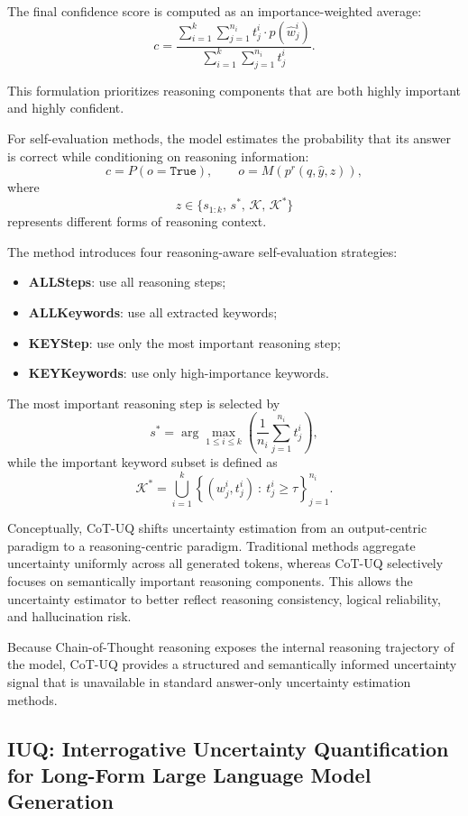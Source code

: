 The final confidence score is computed as an importance-weighted average:
\[
c
=
\frac{
\sum_{i=1}^k \sum_{j=1}^{n_i}
t_j^i \cdot p(\hat w_j^i)
}{
\sum_{i=1}^k \sum_{j=1}^{n_i}
t_j^i
}.
\]

This formulation prioritizes reasoning components that are both highly important and highly confident.

For self-evaluation methods, the model estimates the probability that its answer is correct while conditioning on reasoning information:
\[
c
=
P(o=\texttt{True}),
\qquad
o = M(p^r(q,\hat y,z)),
\]
where
\[
z
\in
\{s_{1:k},\, s^*,\, \mathcal K,\, \mathcal K^*\}
\]
represents different forms of reasoning context.

The method introduces four reasoning-aware self-evaluation strategies:

\begin{itemize}
    \item \textbf{ALLSteps}: use all reasoning steps;
    \item \textbf{ALLKeywords}: use all extracted keywords;
    \item \textbf{KEYStep}: use only the most important reasoning step;
    \item \textbf{KEYKeywords}: use only high-importance keywords.
\end{itemize}

The most important reasoning step is selected by
\[
s^*
=
\arg\max_{1\le i\le k}
\left(
\frac{1}{n_i}
\sum_{j=1}^{n_i}
t_j^i
\right),
\]
while the important keyword subset is defined as
\[
\mathcal K^*
=
\bigcup_{i=1}^k
\left\{
(w_j^i,t_j^i)
~:~
t_j^i \ge \tau
\right\}_{j=1}^{n_i}.
\]

Conceptually, CoT-UQ shifts uncertainty estimation from an output-centric paradigm to a reasoning-centric paradigm. Traditional methods aggregate uncertainty uniformly across all generated tokens, whereas CoT-UQ selectively focuses on semantically important reasoning components. This allows the uncertainty estimator to better reflect reasoning consistency, logical reliability, and hallucination risk.

Because Chain-of-Thought reasoning exposes the internal reasoning trajectory of the model, CoT-UQ provides a structured and semantically informed uncertainty signal that is unavailable in standard answer-only uncertainty estimation methods.


\subsection{IUQ: Interrogative Uncertainty Quantification for Long-Form Large
Language Model Generation}

